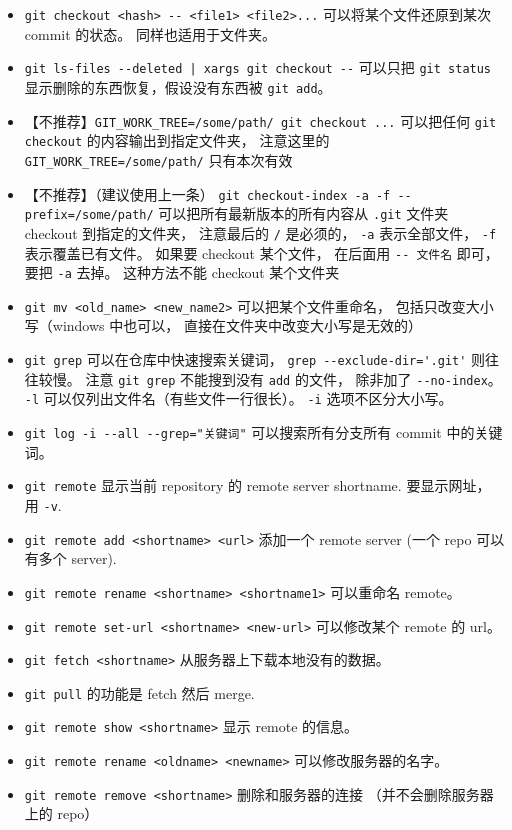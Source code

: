 \begin{itemize}
\item \verb`git checkout <hash> -- <file1> <file2>...` 可以将某个文件还原到某次 commit 的状态。 同样也适用于文件夹。
\item \verb`git ls-files --deleted | xargs git checkout --` 可以只把 \verb`git status` 显示删除的东西恢复，假设没有东西被 \verb`git add`。
\item 【不推荐】\verb`GIT_WORK_TREE=/some/path/ git checkout ...` 可以把任何 \verb`git checkout` 的内容输出到指定文件夹， 注意这里的 \verb`GIT_WORK_TREE=/some/path/` 只有本次有效
\item 【不推荐】（建议使用上一条） \verb`git checkout-index -a -f --prefix=/some/path/` 可以把所有最新版本的所有内容从 \verb`.git` 文件夹 checkout 到指定的文件夹， 注意最后的 \verb`/` 是必须的， \verb`-a` 表示全部文件， \verb`-f` 表示覆盖已有文件。 如果要 checkout 某个文件， 在后面用 \verb`-- 文件名` 即可， 要把 \verb`-a` 去掉。 这种方法不能 checkout 某个文件夹
\item \verb`git mv <old_name> <new_name2>` 可以把某个文件重命名， 包括只改变大小写（windows 中也可以， 直接在文件夹中改变大小写是无效的）
\item \verb`git grep` 可以在仓库中快速搜索关键词， \verb`grep --exclude-dir='.git'` 则往往较慢。 注意 \verb`git grep` 不能搜到没有 \verb`add` 的文件， 除非加了 \verb`--no-index`。 \verb`-l` 可以仅列出文件名（有些文件一行很长）。 \verb`-i` 选项不区分大小写。
\item \verb`git log -i --all --grep="关键词"` 可以搜索所有分支所有 commit 中的关键词。
\item \verb`git remote` 显示当前 repository 的 remote server shortname. 要显示网址， 用 \verb`-v`.
\item \verb`git remote add <shortname> <url>` 添加一个 remote server (一个 repo 可以有多个 server).
\item \verb`git remote rename <shortname> <shortname1>` 可以重命名 remote。
\item \verb`git remote set-url <shortname> <new-url>` 可以修改某个 remote 的 url。
\item \verb`git fetch <shortname>` 从服务器上下载本地没有的数据。
\item \verb`git pull` 的功能是 fetch 然后 merge.
\item \verb`git remote show <shortname>` 显示 remote 的信息。
\item \verb`git remote rename <oldname> <newname>` 可以修改服务器的名字。
\item \verb`git remote remove <shortname>` 删除和服务器的连接 （并不会删除服务器上的 repo）

\end{itemize}
